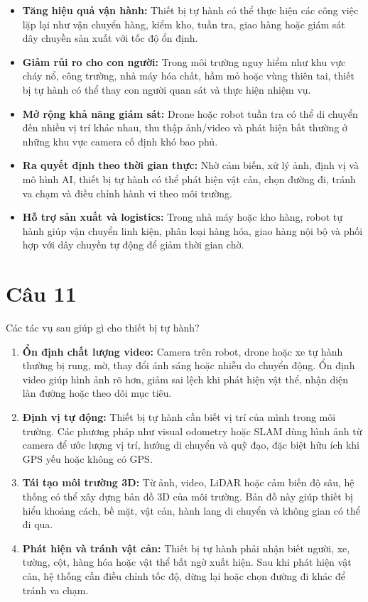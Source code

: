 \begin{itemize}
    \item \textbf{Tăng hiệu quả vận hành:} Thiết bị tự hành có thể thực hiện các công việc lặp lại như vận chuyển hàng, kiểm kho, tuần tra, giao hàng hoặc giám sát dây chuyền sản xuất với tốc độ ổn định.

    \item \textbf{Giảm rủi ro cho con người:} Trong môi trường nguy hiểm như khu vực cháy nổ, công trường, nhà máy hóa chất, hầm mỏ hoặc vùng thiên tai, thiết bị tự hành có thể thay con người quan sát và thực hiện nhiệm vụ.

    \item \textbf{Mở rộng khả năng giám sát:} Drone hoặc robot tuần tra có thể di chuyển đến nhiều vị trí khác nhau, thu thập ảnh/video và phát hiện bất thường ở những khu vực camera cố định khó bao phủ.

    \item \textbf{Ra quyết định theo thời gian thực:} Nhờ cảm biến, xử lý ảnh, định vị và mô hình AI, thiết bị tự hành có thể phát hiện vật cản, chọn đường đi, tránh va chạm và điều chỉnh hành vi theo môi trường.

    \item \textbf{Hỗ trợ sản xuất và logistics:} Trong nhà máy hoặc kho hàng, robot tự hành giúp vận chuyển linh kiện, phân loại hàng hóa, giao hàng nội bộ và phối hợp với dây chuyền tự động để giảm thời gian chờ.
\end{itemize}


\section*{Câu 11}
Các tác vụ sau giúp gì cho thiết bị tự hành?

\begin{enumerate}
    \item \textbf{Ổn định chất lượng video:} Camera trên robot, drone hoặc xe tự hành thường bị rung, mờ, thay đổi ánh sáng hoặc nhiễu do chuyển động. Ổn định video giúp hình ảnh rõ hơn, giảm sai lệch khi phát hiện vật thể, nhận diện làn đường hoặc theo dõi mục tiêu.

    \item \textbf{Định vị tự động:} Thiết bị tự hành cần biết vị trí của mình trong môi trường. Các phương pháp như visual odometry hoặc SLAM dùng hình ảnh từ camera để ước lượng vị trí, hướng di chuyển và quỹ đạo, đặc biệt hữu ích khi GPS yếu hoặc không có GPS.

    \item \textbf{Tái tạo môi trường 3D:} Từ ảnh, video, LiDAR hoặc cảm biến độ sâu, hệ thống có thể xây dựng bản đồ 3D của môi trường. Bản đồ này giúp thiết bị hiểu khoảng cách, bề mặt, vật cản, hành lang di chuyển và không gian có thể đi qua.

    \item \textbf{Phát hiện và tránh vật cản:} Thiết bị tự hành phải nhận biết người, xe, tường, cột, hàng hóa hoặc vật thể bất ngờ xuất hiện. Sau khi phát hiện vật cản, hệ thống cần điều chỉnh tốc độ, dừng lại hoặc chọn đường đi khác để tránh va chạm.
\end{enumerate}


